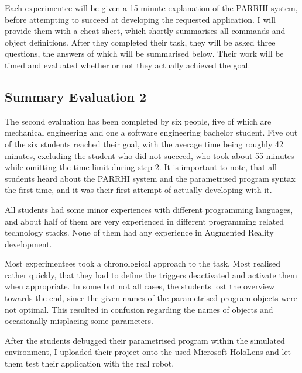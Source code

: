 \FloatBarrier

Each experimentee will be given a 15 minute explanation of the PARRHI system, before attempting to succeed at developing the requested application. I will provide them with a cheat sheet, which shortly summarises all commands and object definitions. After they completed their task, they will be asked three questions, the answers of which will be summarised below. Their work will be timed and evaluated whether or not they actually achieved the goal.

\subsection{Summary Evaluation 2}

The second evaluation has been completed by six people, five of which are mechanical engineering and one a software engineering bachelor student. Five out of the six students reached their goal, with the average time being roughly 42 minutes, excluding the student who did not succeed, who took about 55 minutes while omitting the time limit during step 2. It is important to note, that all students heard about the PARRHI system and the parametrised program syntax the first time, and it was their first attempt of actually developing with it. 

All students had some minor experiences with different programming languages, and about half of them are very experienced in different programming related technology stacks. None of them had any experience in Augmented Reality development. 

Most experimentees took a chronological approach to the task. Most realised rather quickly, that they had to define the triggers deactivated and activate them when appropriate. In some but not all cases, the students lost the overview towards the end, since the given names of the parametrised program objects were not optimal. This resulted in confusion regarding the names of objects and occasionally misplacing some parameters.

After the students debugged their parametrised program within the simulated environment, I uploaded their project onto the used Microsoft HoloLens and let them test their application with the real robot.

